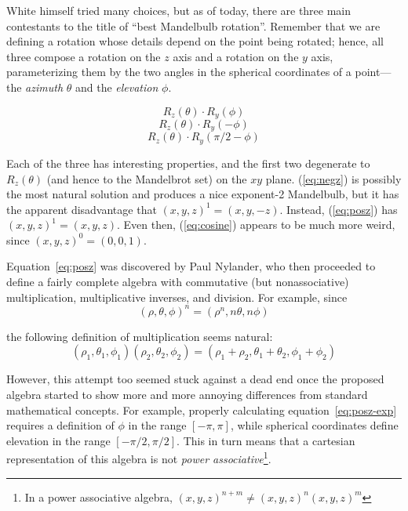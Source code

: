 \documentclass{article}
\begin{document}
White himself tried many choices, but as of today, there are three
main contestants to the title of ``best Mandelbulb rotation''.
Remember that we are defining a rotation whose details depend on the
point being rotated; hence, all three compose a rotation on the $z$ axis
and a rotation on the $y$ axis, parameterizing them by the two angles in
the spherical coordinates of a point---the \emph{azimuth} $\theta$ and
the \emph{elevation} $\phi$.

\begin{equation}
\label{eq:negz}
  R_z(\theta) \cdot R_y(\phi)
\end{equation}
\begin{equation}
\label{eq:posz}
  R_z(\theta) \cdot R_y(-\phi)
\end{equation}
\begin{equation}
\label{eq:cosine}
  R_z(\theta) \cdot R_y(\pi/2-\phi)
\end{equation}

Each of the three has interesting properties, and the first two
degenerate to $R_z(\theta)$ (and hence to the Mandelbrot set) on the
$xy$ plane.  (\ref{eq:negz}) is possibly the most natural solution and
produces a nice exponent-2 Mandelbulb, but it has the apparent
disadvantage that $(x,y,z)^1=(x,y,-z)$.  Instead, (\ref{eq:posz}) has
$(x,y,z)^1=(x,y,z)$.  Even then, (\ref{eq:cosine}) appears to be
much more weird, since $(x,y,z)^0=(0,0,1)$.

Equation~\ref{eq:posz} was discovered by Paul Nylander, who then proceeded to
define a fairly complete algebra with commutative (but nonassociative)
multiplication, multiplicative inverses, and division.  For example,
since
\begin{equation}
  \label{eq:posz-exp}
  (\rho,\theta,\phi)^n=(\rho^n, n\theta, n\phi)
\end{equation}

\noindent
the following definition of multiplication seems natural:
\begin{equation*}
  (\rho_1,\theta_1,\phi_1) (\rho_2,\theta_2,\phi_2)=
  (\rho_1+\rho_2,\theta_1+\theta_2,\phi_1+\phi_2)
\end{equation*}

\noindent
However, this attempt too seemed stuck against a dead end once the
proposed algebra started to show more and more annoying differences
from standard mathematical concepts.  For example, properly
calculating equation~\ref{eq:posz-exp} requires a definition of
$\phi$ in the range $[-\pi,\pi]$, while spherical coordinates define
elevation in the range $[-\pi/2,\pi/2]$.  This in turn means that a
cartesian representation of this algebra is not \emph{power
  associative}\footnote{In a power associative algebra, $(x,y,z)^{n+m}
  \ne (x,y,z)^n (x,y,z)^m$}.
\end{document}

